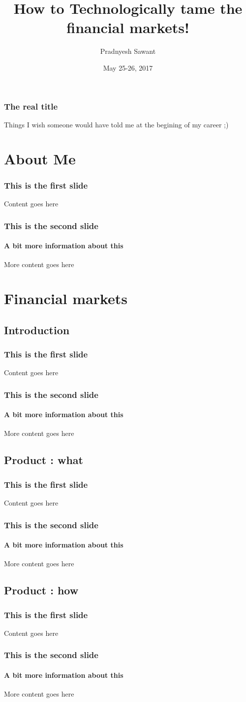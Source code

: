 \documentclass{beamer}
\title{How to Technologically tame the financial markets!}
\author{Pradnyesh Sawant}
\date{May 25-26, 2017}
\begin{document}
\frame{\titlepage}

\begin{frame}
  \frametitle{The real title}
  Things I wish someone would have told me at the begining of my career ;)
\end{frame}

\section{About Me}
\begin{frame}
  \frametitle{This is the first slide}
  Content goes here
\end{frame}
\begin{frame}
  \frametitle{This is the second slide}
  \framesubtitle{A bit more information about this}
  More content goes here
\end{frame}

\section{Financial markets}
\subsection{Introduction}
\begin{frame}
  \frametitle{This is the first slide}
  Content goes here
\end{frame}
\begin{frame}
  \frametitle{This is the second slide}
  \framesubtitle{A bit more information about this}
  More content goes here
\end{frame}
\subsection{Product : what}
\begin{frame}
  \frametitle{This is the first slide}
  Content goes here
\end{frame}
\begin{frame}
  \frametitle{This is the second slide}
  \framesubtitle{A bit more information about this}
  More content goes here
\end{frame}
\subsection{Product : how}
\begin{frame}
  \frametitle{This is the first slide}
  Content goes here
\end{frame}
\begin{frame}
  \frametitle{This is the second slide}
  \framesubtitle{A bit more information about this}
  More content goes here
\end{frame}
\end{document}
